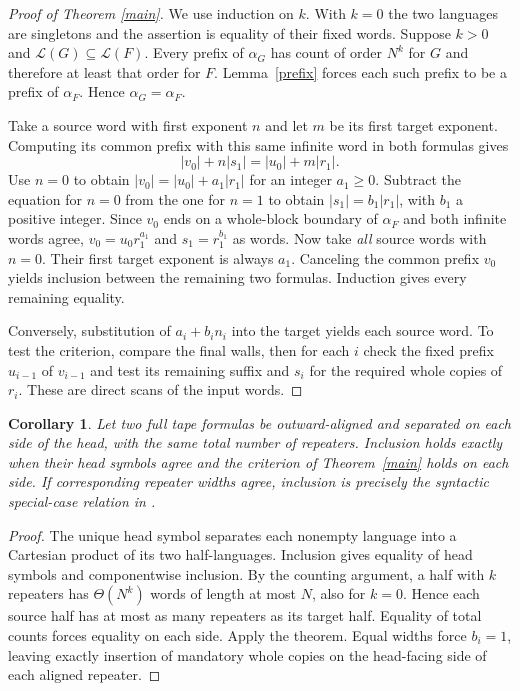 \documentclass[11pt]{article}
\newtheorem{corollary}[theorem]{Corollary}
\newcommand{\Lang}{\mathcal L}
\begin{document}
\begin{proof}[Proof of Theorem \ref{main}]
We use induction on $k$. With $k=0$ the two languages are singletons and the assertion is equality of their fixed words. Suppose $k>0$ and $\Lang(G)\subseteq\Lang(F)$. Every prefix of $\alpha_G$ has count of order $N^k$ for $G$ and therefore at least that order for $F$. Lemma~\ref{prefix} forces each such prefix to be a prefix of $\alpha_F$. Hence $\alpha_G=\alpha_F$.

Take a source word with first exponent $n$ and let $m$ be its first target exponent. Computing its common prefix with this same infinite word in both formulas gives
\[
            |v_0|+n|s_1|=|u_0|+m|r_1|.
\]
Use $n=0$ to obtain $|v_0|=|u_0|+a_1|r_1|$ for an integer $a_1\ge0$. Subtract the equation for $n=0$ from the one for $n=1$ to obtain $|s_1|=b_1|r_1|$, with $b_1$ a positive integer. Since $v_0$ ends on a whole-block boundary of $\alpha_F$ and both infinite words agree, $v_0=u_0r_1^{a_1}$ and $s_1=r_1^{b_1}$ as words. Now take \emph{all} source words with $n=0$. Their first target exponent is always $a_1$. Canceling the common prefix $v_0$ yields inclusion between the remaining two formulas. Induction gives every remaining equality.

Conversely, substitution of $a_i+b_i n_i$ into the target yields each source word. To test the criterion, compare the final walls, then for each $i$ check the fixed prefix $u_{i-1}$ of $v_{i-1}$ and test its remaining suffix and $s_i$ for the required whole copies of $r_i$. These are direct scans of the input words.
\end{proof}

\begin{corollary}
Let two full tape formulas be outward-aligned and separated on each side of the head, with the same total number of repeaters. Inclusion holds exactly when their head symbols agree and the criterion of Theorem~\ref{main} holds on each side. If corresponding repeater widths agree, inclusion is precisely the syntactic special-case relation in \cite[Section 7.1.2]{paper}.
\end{corollary}
\begin{proof}
The unique head symbol separates each nonempty language into a Cartesian product of its two half-languages. Inclusion gives equality of head symbols and componentwise inclusion. By the counting argument, a half with $k$ repeaters has $\Theta(N^k)$ words of length at most $N$, also for $k=0$. Hence each source half has at most as many repeaters as its target half. Equality of total counts forces equality on each side. Apply the theorem. Equal widths force $b_i=1$, leaving exactly insertion of mandatory whole copies on the head-facing side of each aligned repeater.
\end{proof}
\end{document}
